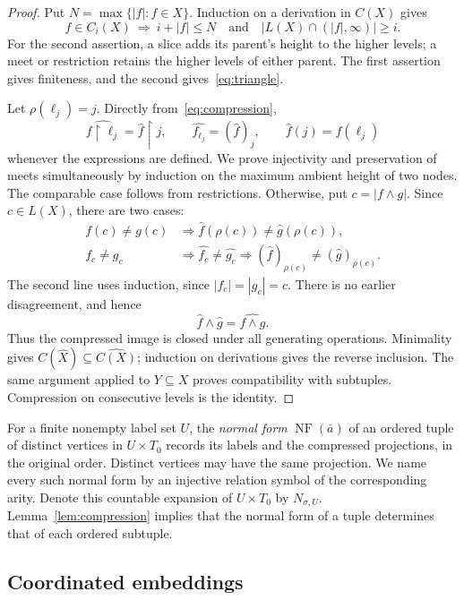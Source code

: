 \documentclass{article}
\numberwithin{equation}{section}
\theoremstyle{definition}
\DeclareMathOperator{\NF}{NF}
\newcommand{\res}{\mathbin{\upharpoonright}}
\begin{document}
\begin{proof}
Put $N=\max\{|f|:f\in X\}$. Induction on a derivation in $C(X)$ gives
\begin{equation}\label{eq:closure-invariants}
 f\in C_i(X)\ \Longrightarrow\
 i+|f|\leq N\quad\text{and}\quad
 |L(X)\cap(|f|,\infty)|\geq i.
\end{equation}
For the second assertion, a slice adds its parent's height to the higher
levels; a meet or restriction retains the higher levels of either parent.
The first assertion gives finiteness, and the second gives~\eqref{eq:triangle}.

Let $\rho(\ell_j)=j$. Directly from~\eqref{eq:compression},
\[
 \widehat{f\res\ell_j}=\widehat f\res j,\qquad
 \widehat{f_{\ell_j}}=(\widehat f)_j,\qquad
 \widehat f(j)=f(\ell_j)
\]
whenever the expressions are defined. We prove injectivity and preservation
of meets simultaneously by induction on the maximum ambient height of two
nodes. The comparable case follows from restrictions. Otherwise, put
$c=|f\wedge g|$. Since $c\in L(X)$, there are two cases:
\[
\begin{array}{ll}
 f(c)\ne g(c)
   &\Longrightarrow\widehat f(\rho(c))\ne\widehat g(\rho(c)),\\[2pt]
 f_c\ne g_c
   &\Longrightarrow\widehat{f_c}\ne\widehat{g_c}
    \Longrightarrow(\widehat f)_{\rho(c)}\ne(\widehat g)_{\rho(c)}.
\end{array}
\]
The second line uses induction, since $|f_c|=|g_c|=c$.
There is no earlier disagreement, and hence
\[
 \widehat f\wedge\widehat g=\widehat{f\wedge g}.
\]
Thus the compressed image is closed under all generating operations.
Minimality gives $C(\widehat X)\subseteq\widehat{C(X)}$; induction on
derivations gives the reverse inclusion. The same argument applied to
$Y\subseteq X$ proves compatibility with subtuples. Compression on
consecutive levels is the identity.
\end{proof}

For a finite nonempty label set $U$, the \emph{normal form} $\NF(\bar a)$ of an ordered
tuple of distinct vertices in $U\times T_0$ records its labels and the
compressed projections, in the original order. Distinct vertices may have
the same projection. We name every such normal form by an injective relation
symbol of the corresponding arity. Denote this countable expansion of
$U\times T_0$ by $N_{\sigma,U}$. Lemma~\ref{lem:compression} implies that
the normal form of a tuple determines that of each ordered subtuple.

\subsection{Coordinated embeddings}
\end{document}
